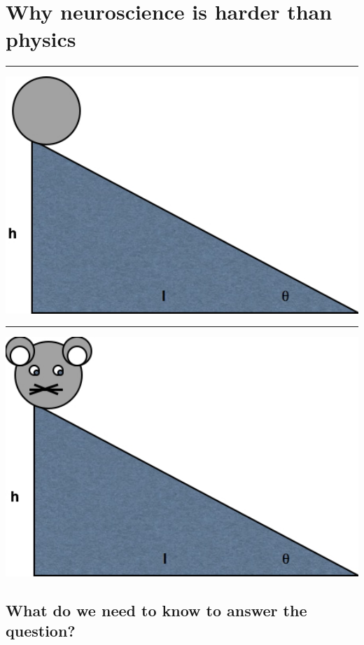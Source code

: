 \documentclass[]{article}
\begin{document}
\section{Why neuroscience is harder than
physics}\label{why-neuroscience-is-harder-than-physics}

\begin{center}\rule{0.5\linewidth}{\linethickness}\end{center}

\includegraphics[width=6.12in]{img/psych-harder-1}

\begin{center}\rule{0.5\linewidth}{\linethickness}\end{center}

\includegraphics[width=6.17in]{img/psych-harder-2}

\subsection{What do we need to know to answer the
question?}\label{what-do-we-need-to-know-to-answer-the-question}
\end{document}
